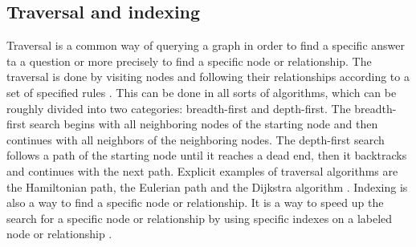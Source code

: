 \subsection{Traversal and indexing}\label{subsec:traversal-and-indexing}
Traversal is a common way of querying a graph in order to find a specific answer ta a question or more precisely to find a
specific node or relationship.
The traversal is done by visiting nodes and following their relationships according to a set of specified rules \parencite[compare P.7]{PractivalNeo4j}.
This can be done in all sorts of algorithms, which can be roughly divided into two categories: breadth-first and depth-first.
The breadth-first  search begins with all neighboring nodes of the starting node and then continues with all neighbors of the neighboring nodes.
The depth-first search follows a path of the starting node until it reaches a dead end, then it backtracks and continues with the next path.
Explicit examples of traversal algorithms are the Hamiltonian path, the Eulerian path and the Dijkstra algorithm \parencite[compare]{juypiter:Graph}.
Indexing is also a way to find a specific node or relationship.
It is a way to speed up the search for a specific node or relationship by using specific indexes on a labeled node or relationship \parencite[compare P.7]{PractivalNeo4j}.